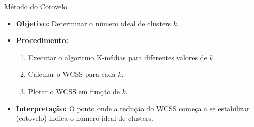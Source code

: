 \documentclass{beamer}
\begin{document}
\begin{frame}{Método do Cotovelo}
    \begin{itemize}
        \item \textbf{Objetivo:} Determinar o número ideal de clusters \( k \).
        \item \textbf{Procedimento:}
        \begin{enumerate}
            \item Executar o algoritmo K-médias para diferentes valores de \( k \).
            \item Calcular o WCSS para cada \( k \).
            \item Plotar o WCSS em função de \( k \).
        \end{enumerate}
        \item \textbf{Interpretação:} O ponto onde a redução do WCSS começa a se estabilizar (cotovelo) indica o número ideal de clusters.
    \end{itemize}
    \vspace{0.2cm}
    \begin{center}
    \end{center}
\end{frame}
\end{document}
